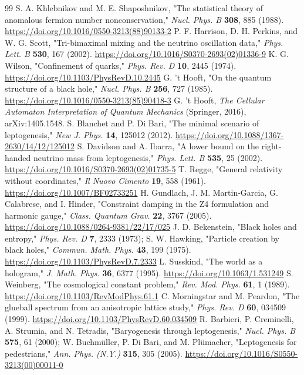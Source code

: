 \documentclass[aps,prd,amsmath,amssymb,superscriptaddress,longbibliography,floatfix,preprint]{revtex4-2}
\begin{document}
\begin{thebibliography}{99}
 S. A. Khlebnikov and M. E. Shaposhnikov, "The statistical theory of anomalous fermion number nonconservation," \emph{Nucl. Phys. B} \textbf{308}, 885 (1988). \url{https://doi.org/10.1016/0550-3213(88)90133-2}
 P. F. Harrison, D. H. Perkins, and W. G. Scott, "Tri-bimaximal mixing and the neutrino oscillation data," \emph{Phys. Lett. B} \textbf{530}, 167 (2002). \url{https://doi.org/10.1016/S0370-2693(02)01336-9}
 K. G. Wilson, "Confinement of quarks," \emph{Phys. Rev. D} \textbf{10}, 2445 (1974). \url{https://doi.org/10.1103/PhysRevD.10.2445}
 G. 't Hooft, "On the quantum structure of a black hole," \emph{Nucl. Phys. B} \textbf{256}, 727 (1985). \url{https://doi.org/10.1016/0550-3213(85)90418-3}
 G. 't Hooft, \emph{The Cellular Automaton Interpretation of Quantum Mechanics} (Springer, 2016), arXiv:1405.1548.
 S. Blanchet and P. Di Bari, "The minimal scenario of leptogenesis," \emph{New J. Phys.} \textbf{14}, 125012 (2012). \url{https://doi.org/10.1088/1367-2630/14/12/125012}
 S. Davidson and A. Ibarra, "A lower bound on the right-handed neutrino mass from leptogenesis," \emph{Phys. Lett. B} \textbf{535}, 25 (2002). \url{https://doi.org/10.1016/S0370-2693(02)01735-5}
 T. Regge, "General relativity without coordinates," \emph{Il Nuovo Cimento} \textbf{19}, 558 (1961). \url{https://doi.org/10.1007/BF02733251}
 H. Gundlach, J. M. Martin-Garcia, G. Calabrese, and I. Hinder, "Constraint damping in the Z4 formulation and harmonic gauge," \emph{Class. Quantum Grav.} \textbf{22}, 3767 (2005). \url{https://doi.org/10.1088/0264-9381/22/17/025}
 J. D. Bekenstein, "Black holes and entropy," \emph{Phys. Rev. D} \textbf{7}, 2333 (1973); S. W. Hawking, "Particle creation by black holes," \emph{Commun. Math. Phys.} \textbf{43}, 199 (1975). \url{https://doi.org/10.1103/PhysRevD.7.2333}
 L. Susskind, "The world as a hologram," \emph{J. Math. Phys.} \textbf{36}, 6377 (1995). \url{https://doi.org/10.1063/1.531249}
 S. Weinberg, "The cosmological constant problem," \emph{Rev. Mod. Phys.} \textbf{61}, 1 (1989). \url{https://doi.org/10.1103/RevModPhys.61.1}
 C. Morningstar and M. Peardon, "The glueball spectrum from an anisotropic lattice study," \emph{Phys. Rev. D} \textbf{60}, 034509 (1999). \url{https://doi.org/10.1103/PhysRevD.60.034509}
 R. Barbieri, P. Creminelli, A. Strumia, and N. Tetradis, "Baryogenesis through leptogenesis," \emph{Nucl. Phys. B} \textbf{575}, 61 (2000); W. Buchmüller, P. Di Bari, and M. Plümacher, "Leptogenesis for pedestrians," \emph{Ann. Phys. (N.Y.)} \textbf{315}, 305 (2005). \url{https://doi.org/10.1016/S0550-3213(00)00011-0}

\end{thebibliography}
\end{document}
